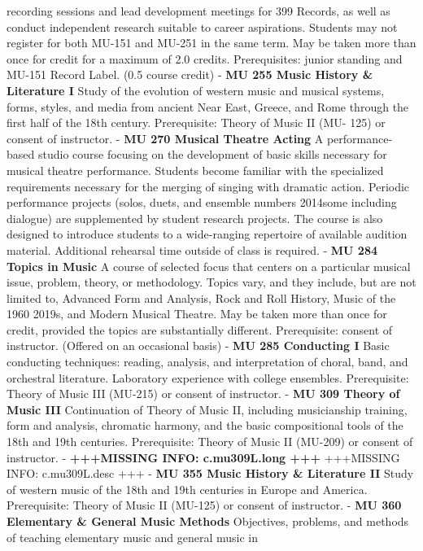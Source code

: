 \documentclass[
  letterpaper,
]{scrbook}
\begin{document}
recording sessions and lead development meetings for 399 Records, as
well as conduct independent research suitable to career aspirations.
Students may not register for both MU-151 and MU-251 in the same term.
May be taken more than once for credit for a maximum of 2.0 credits.
Prerequisites: junior standing and MU-151 Record Label. (0.5 course
credit) - \textbf{MU 255 Music History \& Literature I} Study of the
evolution of western music and musical systems, forms, styles, and media
from ancient Near East, Greece, and Rome through the first half of the
18th century. Prerequisite: Theory of Music II (MU- 125) or consent of
instructor. - \textbf{MU 270 Musical Theatre Acting} A performance-based
studio course focusing on the development of basic skills necessary for
musical theatre performance. Students become familiar with the
specialized requirements necessary for the merging of singing with
dramatic action. Periodic performance projects (solos, duets, and
ensemble numbers 2014some including dialogue) are supplemented by
student research projects. The course is also designed to introduce
students to a wide-ranging repertoire of available audition material.
Additional rehearsal time outside of class is required. - \textbf{MU 284
Topics in Music} A course of selected focus that centers on a particular
musical issue, problem, theory, or methodology. Topics vary, and they
include, but are not limited to, Advanced Form and Analysis, Rock and
Roll History, Music of the 1960 2019s, and Modern Musical Theatre. May
be taken more than once for credit, provided the topics are
substantially different. Prerequisite: consent of instructor. (Offered
on an occasional basis) - \textbf{MU 285 Conducting I} Basic conducting
techniques: reading, analysis, and interpretation of choral, band, and
orchestral literature. Laboratory experience with college ensembles.
Prerequisite: Theory of Music III (MU-215) or consent of instructor. -
\textbf{MU 309 Theory of Music III} Continuation of Theory of Music II,
including musicianship training, form and analysis, chromatic harmony,
and the basic compositional tools of the 18th and 19th centuries.
Prerequisite: Theory of Music II (MU-209) or consent of instructor. -
\textbf{+++MISSING INFO: c.mu309L.long +++} +++MISSING INFO:
c.mu309L.desc +++ - \textbf{MU 355 Music History \& Literature II} Study
of western music of the 18th and 19th centuries in Europe and America.
Prerequisite: Theory of Music II (MU-125) or consent of instructor. -
\textbf{MU 360 Elementary \& General Music Methods} Objectives,
problems, and methods of teaching elementary music and general music in
\end{document}
